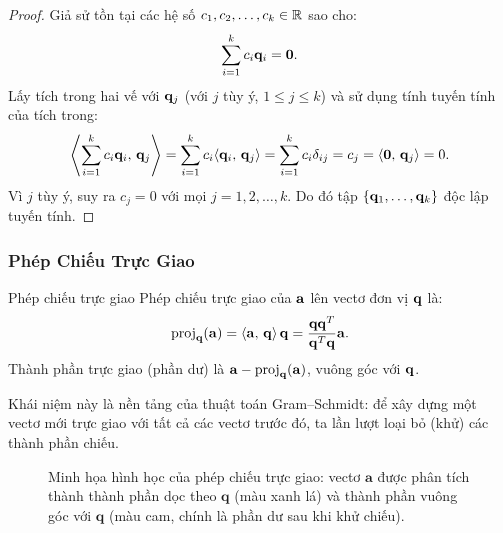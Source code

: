 \begin{proof}
Giả sử tồn tại các hệ số $c_1, c_2, \ldots, c_k \in \R$ sao cho:
\[
    \sum_{i=1}^{k} c_i \mat{q}_i = \mat{0}.
\]
Lấy tích trong hai vế với $\mat{q}_j$ (với $j$ tùy ý, $1 \leq j \leq k$) và sử dụng
tính tuyến tính của tích trong:
\[
    \left\langle \sum_{i=1}^{k} c_i \mat{q}_i,\, \mat{q}_j \right\rangle
    = \sum_{i=1}^{k} c_i \inner{\mat{q}_i}{\mat{q}_j}
    = \sum_{i=1}^{k} c_i \delta_{ij}
    = c_j
    = \inner{\mat{0}}{\mat{q}_j} = 0.
\]
Vì $j$ tùy ý, suy ra $c_j = 0$ với mọi $j = 1, 2, \ldots, k$. Do đó tập
$\{\mat{q}_1, \ldots, \mat{q}_k\}$ độc lập tuyến tính.
\end{proof}

\subsubsection{Phép Chiếu Trực Giao}

\begin{mydef}{Phép chiếu trực giao}{}
Phép chiếu trực giao của $\mat{a}$ lên vectơ đơn vị $\mat{q}$ là:
\[
    \proj{\mat{a}}{\mat{q}} = \inner{\mat{a}}{\mat{q}} \, \mat{q} = \frac{\mat{q}\mat{q}^T}{\mat{q}^T\mat{q}} \mat{a}.
\]
Thành phần trực giao (phần dư) là $\mat{a} - \proj{\mat{a}}{\mat{q}}$, vuông góc với $\mat{q}$.
\end{mydef}

Khái niệm này là nền tảng của thuật toán Gram--Schmidt: để xây dựng một vectơ mới
trực giao với tất cả các vectơ trước đó, ta lần lượt loại bỏ (khử) các thành phần
chiếu.

\begin{figure}[H]
\centering
{}
\caption{Minh họa hình học của phép chiếu trực giao: vectơ $\mathbf{a}$ được
phân tích thành thành phần dọc theo $\mathbf{q}$ (màu xanh lá) và thành phần
vuông góc với $\mathbf{q}$ (màu cam, chính là phần dư sau khi khử chiếu).}
\label{fig:orthogonal_projection}
\end{figure}

